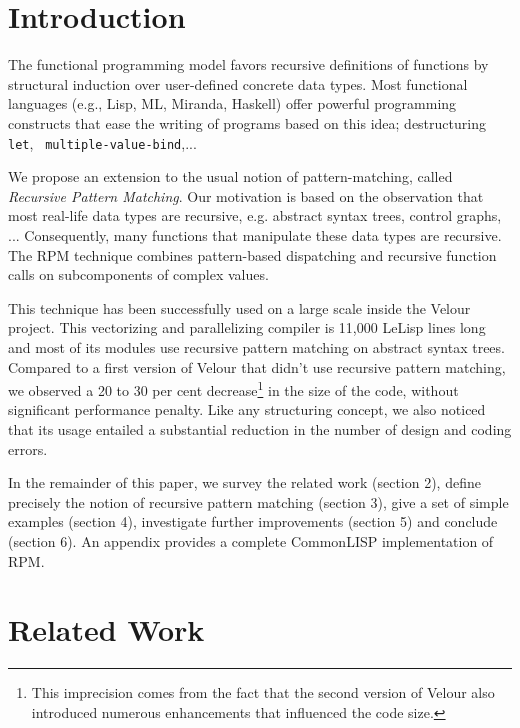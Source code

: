 \begin{sloppypar}

\maketitle

\section{Introduction}

The functional programming model favors recursive definitions of
functions by structural induction over user-defined concrete data
types. Most functional languages (e.g., Lisp, ML, Miranda, Haskell)
offer powerful programming constructs that ease the writing of
programs based on this idea; destructuring {\tt let}, {\tt
multiple-value-bind},... 

We propose an extension to the usual notion of pattern-matching,
called {\em Recursive Pattern Matching}. Our motivation is based on
the observation that most real-life data types are recursive, e.g.
abstract syntax trees, control graphs, ...  Consequently, many
functions that manipulate these data types are recursive. The RPM
technique combines pattern-based dispatching and recursive function
calls on subcomponents of complex values.

This technique has been successfully used on a large scale inside the
Velour project. This vectorizing and parallelizing compiler is 11,000
LeLisp lines long and most of its modules use recursive pattern
matching on abstract syntax trees. Compared to a first version of
Velour that didn't use recursive pattern matching, we observed a 20 to
30 per cent decrease\footnote{This imprecision comes from the fact
that the second version of Velour also introduced numerous
enhancements that influenced the code size.} in the size of the code,
without significant performance penalty. Like any structuring concept,
we also noticed that its usage entailed a substantial reduction in the
number of design and coding errors.

In the remainder of this paper, we survey the related work (section
2), define precisely the notion of recursive pattern matching (section
3), give a set of simple examples (section 4), investigate further
improvements (section 5) and conclude (section 6). An appendix provides a
complete CommonLISP implementation of RPM.
 
\section{Related Work}


\end{sloppypar}
